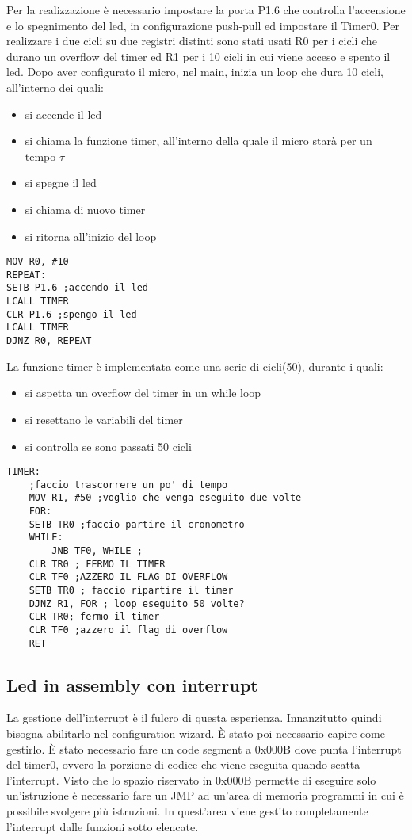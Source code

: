 \documentclass[main.tex]{subfiles}
\begin{document}
Per la realizzazione è necessario impostare la porta P1.6 che controlla l’accensione e lo spegnimento del led, in configurazione push-pull ed impostare il Timer0.
Per realizzare i due cicli su due registri distinti sono stati usati R0 per i cicli che durano un overflow del timer ed R1 per i 10 cicli in cui viene acceso e spento il led. 
Dopo aver configurato il micro, nel main, inizia un loop che dura 10 cicli, all'interno dei quali:
\begin{itemize}
    \item si accende il led
    \item si chiama la funzione timer, all'interno della quale il micro starà per un tempo $\tau$
    \item si spegne il led
    \item si chiama di nuovo timer
    \item si ritorna all'inizio del loop
\end{itemize}
\begin{lstlisting}[caption=Main del programma]
MOV R0, #10
REPEAT:
SETB P1.6 ;accendo il led
LCALL TIMER
CLR P1.6 ;spengo il led
LCALL TIMER
DJNZ R0, REPEAT
\end{lstlisting}
La funzione timer è implementata come una serie di cicli(50), durante i quali:
\begin{itemize}
    \item si aspetta un overflow del timer in un while loop
    \item si resettano le variabili del timer
    \item si controlla se sono passati 50 cicli
\end{itemize}
\begin{lstlisting}[caption=Funzione timer]
TIMER:
	;faccio trascorrere un po' di tempo
	MOV R1, #50 ;voglio che venga eseguito due volte
	FOR:
	SETB TR0 ;faccio partire il cronometro
	WHILE:
		JNB TF0, WHILE ;
	CLR TR0 ; FERMO IL TIMER
	CLR TF0 ;AZZERO IL FLAG DI OVERFLOW
	SETB TR0 ; faccio ripartire il timer
	DJNZ R1, FOR ; loop eseguito 50 volte?
	CLR TR0; fermo il timer
	CLR TF0 ;azzero il flag di overflow
	RET
\end{lstlisting}


\subsection{Led in assembly con interrupt}

La gestione dell'interrupt è il fulcro di questa esperienza. Innanzitutto quindi bisogna abilitarlo nel configuration wizard. È stato poi necessario capire come gestirlo. È stato necessario fare un code segment a 0x000B dove punta l'interrupt del timer0, ovvero la porzione di codice che viene eseguita quando scatta l'interrupt. Visto che lo spazio riservato in 0x000B permette di eseguire solo un'istruzione è necessario fare un JMP ad un'area di memoria programmi in cui è possibile svolgere più istruzioni. In quest'area viene gestito completamente l'interrupt dalle funzioni sotto elencate.
\end{document}
